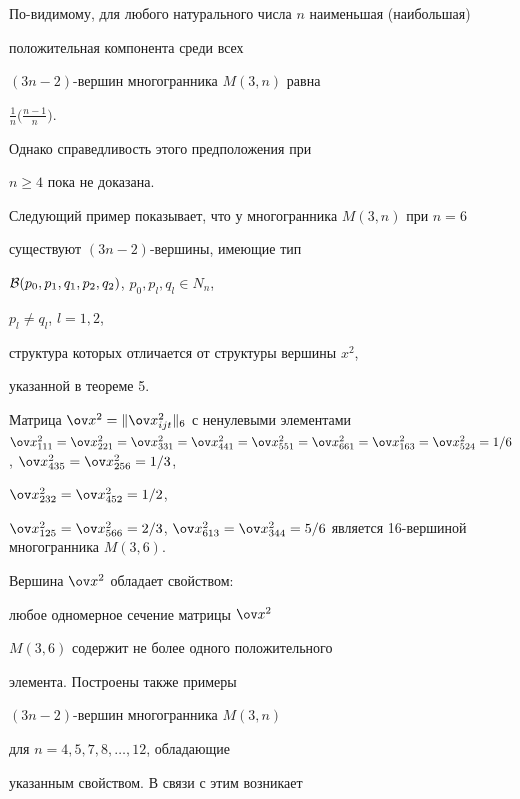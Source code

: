 По-видимому, для любого натурального числа $n$ наименьшая (наибольшая)


положительная компонента среди всех


$(3n-2)$-вершин многогранника $M(3,n)$ равна


$\frac{1}n \big(\frac{n-1}n\big)$.


Однако справедливость этого предположения при


$n\ge 4$ пока не доказана.





Следующий пример показывает, что у многогранника $M(3,n)$ при $n=6$ 


существуют $(3n-2)$-вершины, имеющие тип


${\cal B}(p_0,p_1,q_1,p_2,q_2)$, $p_0,p_l,q_l\in N_n$,


$p_l\ne q_l$, $l=1,2$, 


структура которых отличается от структуры вершины $x^2$,


указанной в теореме 5.





\begin{exam}


Матрица $\ov x^2=\|\ov x^2_{ijt}\|_6$ с ненулевыми элементами $\ov x^2_


{111}=\ov x^2_{221}=\ov x^2_{331}=\ov x^2_{441}=\ov x^2_{551}=\ov x^2_{661}=


\ov x^2_{163}=\ov x^2_{524}=1/6$, $\ov x^2_{435}=\ov x^2_{256}=1/3$,


$\ov x^2_{232}=\ov x^2_{452}=1/2$,


$\ov x^2_{125}=\ov x^2_{566}=2/3$, $\ov x^2_{613}=\ov


x^2_{344}=5/6$ является 16-вершиной многогранника $M(3,6)$.


\end{exam}





Вершина $\ov x^2$ обладает свойством: 


любое одномерное сечение матрицы $\ov x^2$


$M(3,6)$ содержит не более одного положительного 


элемента. Построены также примеры


$(3n-2)$-вершин многогранника $M(3,n)$


для $n=4,5,7,8,\dotsc,12$, обладающие


указанным свойством. В связи с этим возникает 


